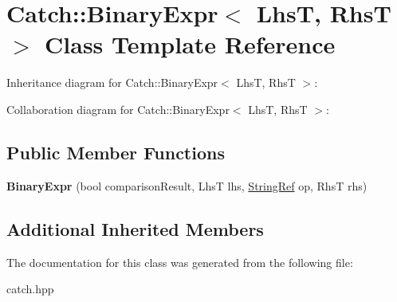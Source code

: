 \hypertarget{classCatch_1_1BinaryExpr}{}\section{Catch\+:\+:Binary\+Expr$<$ LhsT, RhsT $>$ Class Template Reference}
\label{classCatch_1_1BinaryExpr}


Inheritance diagram for Catch\+:\+:Binary\+Expr$<$ LhsT, RhsT $>$\+:


Collaboration diagram for Catch\+:\+:Binary\+Expr$<$ LhsT, RhsT $>$\+:
\subsection*{Public Member Functions}
\begin{DoxyCompactItemize}
\item 
\mbox{\label{classCatch_1_1BinaryExpr_a657d66346aef97a760c22776fe6008b6}} 
{\bfseries Binary\+Expr} (bool comparison\+Result, LhsT lhs, \hyperlink{classCatch_1_1StringRef}{String\+Ref} op, RhsT rhs)
\end{DoxyCompactItemize}
\subsection*{Additional Inherited Members}


The documentation for this class was generated from the following file\+:\begin{DoxyCompactItemize}
\item 
catch.\+hpp\end{DoxyCompactItemize}
